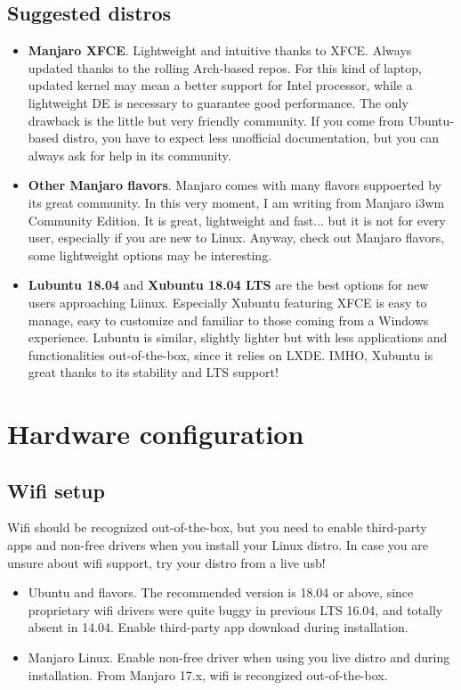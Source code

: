 \documentclass{article}
\begin{document}
\subsection{Suggested distros}
\begin{itemize}
	\item \textbf{Manjaro XFCE}. Lightweight and intuitive thanks to XFCE. Always updated thanks to the rolling Arch-based repos. For this kind of laptop, updated kernel may mean a better support for Intel processor, while a lightweight DE is necessary to guarantee good performance. The only drawback is the little but very friendly community. If you come from Ubuntu-based distro, you have to expect less unofficial documentation, but you can always ask for help in its community.
	\item \textbf{Other Manjaro flavors}. Manjaro comes with many flavors suppoerted by its great community. In this very moment, I am writing from Manjaro i3wm Community Edition. It is great, lightweight and fast... but it is not for every user, especially if you are new to Linux. Anyway, check out Manjaro flavors, some lightweight options may be interesting.
	\item \textbf{Lubuntu 18.04} and \textbf{Xubuntu 18.04 LTS} are the best options for new users approaching Liinux. Especially Xubuntu featuring XFCE is easy to manage, easy to customize and familiar to those coming from a Windows experience. Lubuntu is similar, slightly lighter but with less applications and functionalities out-of-the-box, since it relies on LXDE. IMHO, Xubuntu is great thanks to its stability and LTS support!
\end{itemize}


\section{Hardware configuration}

\subsection{Wifi setup}
Wifi should be recognized out-of-the-box, but you need to enable third-party apps and non-free drivers when you install your Linux distro. In case you are unsure about wifi support, try your distro from a live usb!
\begin{itemize}
	\item Ubuntu and flavors. The recommended version is 18.04 or above, since proprietary wifi drivers were quite buggy in previous LTS 16.04, and totally absent in 14.04. Enable third-party app download during installation.
	\item Manjaro Linux. Enable non-free driver when using you live distro and during installation. From Manjaro 17.x, wifi is recongized out-of-the-box.
\end{itemize}
\end{document}
